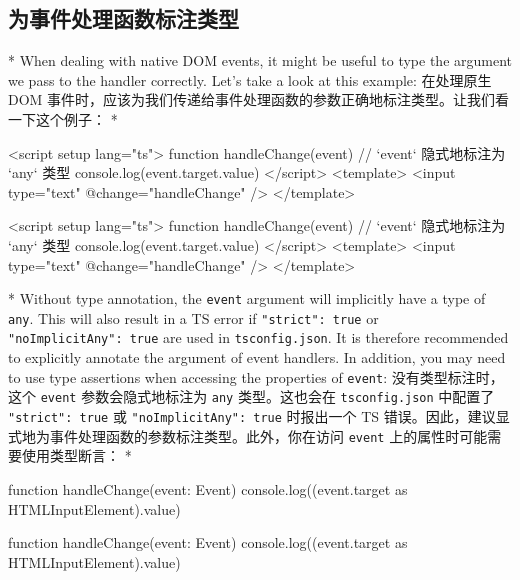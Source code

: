\begin{paracol}{2}
\subsection{为事件处理函数标注类型}
\switchcolumn[0]*%
When dealing with native DOM events, it might be useful to type the
argument we pass to the handler correctly. Let's take a look at this
example:
\switchcolumn
在处理原生 DOM
事件时，应该为我们传递给事件处理函数的参数正确地标注类型。让我们看一下这个例子：
\switchcolumn[0]*%
\begin{codeHtml}
<script setup lang="ts">
function handleChange(event) {
  // `event` 隐式地标注为 `any` 类型
  console.log(event.target.value)
}
</script>
<template>
  <input type="text" @change="handleChange" />
</template>
\end{codeHtml}
\switchcolumn
\begin{codeHtml}
<script setup lang="ts">
function handleChange(event) {
  // `event` 隐式地标注为 `any` 类型
  console.log(event.target.value)
}
</script>
<template>
  <input type="text" @change="handleChange" />
</template>
\end{codeHtml}
\switchcolumn[0]*%
Without type annotation, the \texttt{event} argument will implicitly
have a type of \texttt{any}. This will also result in a TS error if
\texttt{"strict":\ true} or \texttt{"noImplicitAny":\ true} are used in
\texttt{tsconfig.json}. It is therefore recommended to explicitly
annotate the argument of event handlers. In addition, you may need to
use type assertions when accessing the properties of \texttt{event}:
\switchcolumn
没有类型标注时，这个 \texttt{event} 参数会隐式地标注为 \texttt{any}
类型。这也会在 \texttt{tsconfig.json} 中配置了 \texttt{"strict":\ true}
或 \texttt{"noImplicitAny":\ true} 时报出一个 TS
错误。因此，建议显式地为事件处理函数的参数标注类型。此外，你在访问
\texttt{event} 上的属性时可能需要使用类型断言：
\switchcolumn[0]*%
\begin{codeTs}
function handleChange(event: Event) {
  console.log((event.target as HTMLInputElement).value)
}
\end{codeTs}
\switchcolumn
\begin{codeTs}
function handleChange(event: Event) {
  console.log((event.target as HTMLInputElement).value)
}
\end{codeTs}
\end{paracol}

